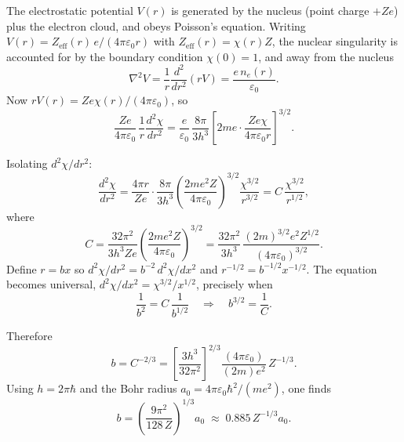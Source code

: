 \documentclass[11pt]{article}
\begin{document}
The electrostatic potential $V(r)$ is generated by the nucleus (point charge $+Ze$) plus the electron cloud, and obeys Poisson's equation. Writing $V(r)=Z_{\text{eff}}(r)\,e/(4\pi\varepsilon_0 r)$ with $Z_{\text{eff}}(r)=\chi(r) Z$, the nuclear singularity is accounted for by the boundary condition $\chi(0)=1$, and away from the nucleus
\begin{equation*}
    \nabla^2 V = \frac{1}{r}\frac{d^2}{dr^2}(rV) = \frac{e\, n_e(r)}{\varepsilon_0}.
\end{equation*}
Now $rV(r)=Z e \chi(r)/(4\pi\varepsilon_0)$, so
\begin{equation}
    \frac{Ze}{4\pi\varepsilon_0}\,\frac{1}{r}\frac{d^2\chi}{dr^2} = \frac{e}{\varepsilon_0}\,\frac{8\pi}{3h^3}\left[2me\cdot\frac{Ze\chi}{4\pi\varepsilon_0 r}\right]^{3/2}. \label{eq:poi}
\end{equation}

Isolating $d^2\chi/dr^2$:
\begin{equation*}
    \frac{d^2\chi}{dr^2} = \frac{4\pi r}{Ze}\cdot\frac{8\pi}{3h^3}\left(\frac{2me^2 Z}{4\pi\varepsilon_0}\right)^{3/2}\frac{\chi^{3/2}}{r^{3/2}} = C\,\frac{\chi^{3/2}}{r^{1/2}},
\end{equation*}
where
\begin{equation*}
    C = \frac{32\pi^2}{3 h^3 Z e}\left(\frac{2me^2 Z}{4\pi\varepsilon_0}\right)^{3/2}
     = \frac{32\pi^2}{3h^3}\,\frac{(2m)^{3/2}e^2 Z^{1/2}}{(4\pi\varepsilon_0)^{3/2}}.
\end{equation*}
Define $r=bx$ so $d^2\chi/dr^2 = b^{-2}\,d^2\chi/dx^2$ and $r^{-1/2}=b^{-1/2}x^{-1/2}$. The equation becomes universal, $d^2\chi/dx^2=\chi^{3/2}/x^{1/2}$, precisely when
\begin{equation*}
    \frac{1}{b^2} = C\,\frac{1}{b^{1/2}} \quad\Longrightarrow\quad b^{3/2}=\frac{1}{C}.
\end{equation*}

Therefore
\begin{equation*}
    b = C^{-2/3} = \left[\frac{3h^3}{32\pi^2}\right]^{2/3}\frac{(4\pi\varepsilon_0)}{(2m)e^2}\,Z^{-1/3}.
\end{equation*}
Using $h=2\pi\hbar$ and the Bohr radius $a_0=4\pi\varepsilon_0\hbar^2/(me^2)$, one finds
\begin{equation}
    \boxed{\;b = \left(\frac{9\pi^2}{128\,Z}\right)^{1/3} a_0 \;\approx\; 0.885\,Z^{-1/3} a_0.\;} \label{eq:b}
\end{equation}
\end{document}
